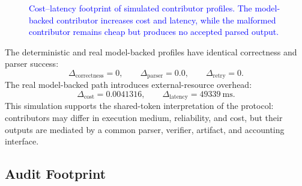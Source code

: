 \documentclass{article}
\theoremstyle{plain}
\begin{document}
\begin{figure}[!htbp]
{{
}
}
\caption{\textcolor{blue}{Cost--latency footprint of simulated contributor profiles. The model-backed contributor increases cost and latency, while the malformed contributor remains cheap but produces no accepted parsed output.}}
\label{fig:cost-latency-footprint}
\end{figure}

The deterministic and real model-backed profiles have identical correctness and
parser success:
\[
  \Delta_{\mathrm{correctness}}=0,\qquad
  \Delta_{\mathrm{parser}}=0.0,\qquad
  \Delta_{\mathrm{retry}}=0.
\]
The real model-backed path introduces external-resource overhead:
\[
  \Delta_{\mathrm{cost}}=0.0041316,\qquad
  \Delta_{\mathrm{latency}}=49339\ \mathrm{ms}.
\]
This simulation supports the shared-token interpretation of the protocol:
contributors may differ in execution medium, reliability, and cost, but their
outputs are mediated by a common parser, verifier, artifact, and accounting
interface.

\FloatBarrier

\subsection{Audit Footprint}
\label{subsec:audit-footprint}
\end{document}

